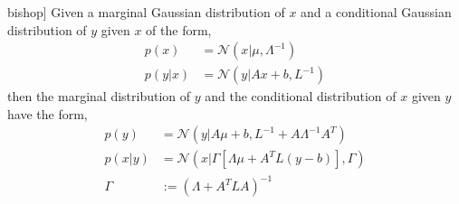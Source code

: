 \begin{testexample2}[Trick with normal distributions \cite[93]{bishop}]
    Given a marginal Gaussian distribution of $x$ and a conditional Gaussian distribution
    of $y$ given $x$ of the form, 
    \begin{align*}
        p(x) &= \mathcal{N}(x|\mu, \Lambda^{-1})\\
        p(y|x) &= \mathcal{N}(y|Ax+b, L^{-1})
    \end{align*}
    then the marginal distribution of $y$ and the conditional distribution of $x$ given $y$
    have the form, 
    \begin{align}
        p(y) &= \mathcal{N}(y|A\mu+b,L^{-1}+A \Lambda^{-1}A^T) \label{marginal_distribution}\\
        p(x|y) &= \mathcal{N}(x|\Gamma [\Lambda \mu+A^TL(y-b)],\Gamma ) \label{posterior_distribution}\\
        \Gamma &:= (\Lambda +A^TLA)^{-1} \label{Gamma}
    \end{align}
\end{testexample2}


